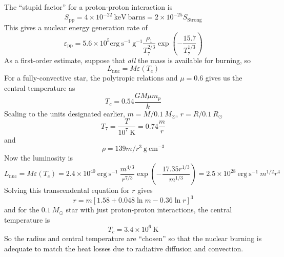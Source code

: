 \documentclass[10pt]{article}
\numberwithin{equation}{section}
\begin{document}
  The ``stupid factor'' for a proton-proton interaction is
  \begin{equation}
    \label{eq:155}
    S_{\mathrm{pp}}=4\times 10^{-22}\ \mathrm{keV\ barns}=2\times
    10^{-25}S_{\mathrm{Strong}}
  \end{equation}
  This gives a nuclear energy generation rate of
  \begin{equation}
    \label{eq:307}
    \varepsilon_{\mathrm{pp}}=5.6\times 10^5 \mathrm{erg\ s^{-1}\ g^{-1}}\frac{\rho_1}{T_7^{2/3}}\exp\left(-\frac{15.7}{T_7^{1/3}}\right)
  \end{equation}
  As a first-order estimate, suppose that \emph{all} the mass is
  available for burning, so 
  \begin{equation}
    \label{eq:156}
    L_{\mathrm{nuc}}=M\varepsilon(T_c)
  \end{equation}
  For a fully-convective star, the polytropic relations and $\mu=0.6$
  gives us the central temperature as
  \begin{equation}
    \label{eq:157}
    T_c=0.54\frac{GM\mu m_p}{k}
  \end{equation}
  Scaling to the units designated earlier, $m=M/0.1\ M_\odot$,
  $r=R/0.1\ R_\odot$
  \begin{equation}
    \label{eq:158}
    T_7=\frac{T}{10^7\ \mathrm{K}}=0.74\frac{m}{r}
  \end{equation}
  and
  \begin{equation}
    \label{eq:159}
    \rho=139 m/r^3\ \mathrm{g\ cm^{-3}}
  \end{equation}
  Now the luminosity is
  \begin{equation}
    \label{eq:160}
    L_{\mathrm{nuc}}=M\varepsilon(T_c)=2.4\times 10^{40}\ \mathrm{erg\
      s^{-1}}\ \frac{m^{4/3}}{r^{7/3}}\exp\left(-\frac{17.35
        r^{1/3}}{m^{1/3}}\right)=2.5\times 10^{28}\ \mathrm{erg\ s^{-1}}\ 
m^{1/2}r^4
  \end{equation}
  Solving this transcendental equation for $r$ gives
  \begin{equation}
    \label{eq:161}
    r=m\left[1.58+0.048\ln m-0.36\ln r\right]^3
  \end{equation}
  and for the $0.1\ M_\odot$ star with just proton-proton
  interactions, the central temperature is
  \begin{equation}
    \label{eq:162}
    T_c=3.4\times 10^6\ \mathrm{K}
  \end{equation}
  So the radius and central temperature are ``chosen'' so that the nuclear
  burning is adequate to match the heat losses due to radiative diffusion and
  convection.\\
\end{document}
